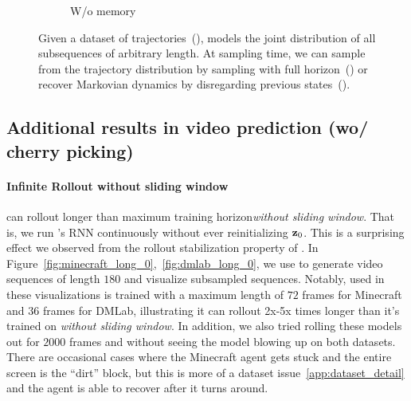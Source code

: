 \begin{figure}[h]
\begin{subfigure}[t]{.3\linewidth}
        \caption{W/o memory} \label{fig:compositionality_wo_memory}
    \end{subfigure}
    \caption{Given a dataset of trajectories~(), \algo{} models the joint distribution of all subsequences of arbitrary length. At sampling time, we can sample from the trajectory distribution by sampling \algo{} with full horizon~() or recover Markovian dynamics by disregarding previous states~().}
    \label{fig:compositionality}
\end{figure}



\subsection{Additional results in video prediction (wo/ cherry picking)}
\paragraph{Infinite Rollout without sliding window}
\algo{} can rollout longer than maximum training horizon\emph{without sliding window}. That is, we run \algo{}'s RNN continuously without ever reinitializing $\mathbf{z}_0$. This is a surprising effect we observed from the rollout stabilization property of \algo{}. In Figure~\ref{fig:minecraft_long_0},~\ref{fig:dmlab_long_0}, we use \algo{} to generate video sequences of length $180$ and visualize subsampled sequences. Notably, \algo{} used in these visualizations is trained with a maximum length of $72$ frames for Minecraft and $36$ frames for DMLab, illustrating it can rollout 2x-5x times longer than it's trained on \emph{without sliding window}. In addition, we also tried rolling these models out for $2000$ frames and without seeing the model blowing up on both datasets. There are occasional cases where the Minecraft agent gets stuck and the entire screen is the ``dirt'' block, but this is more of a dataset issue~\ref{app:dataset_detail} and the agent is able to recover after it turns around. 

